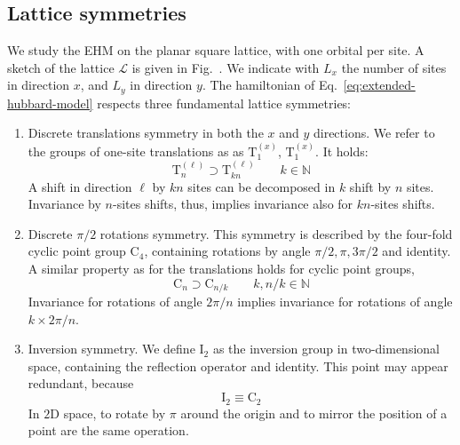 \subsection{Lattice symmetries}\label{subsec:lattice-syms}

We study the EHM on the planar square lattice, with one orbital per site. A sketch of the lattice $\mathcal{L}$ is given in Fig.~\mref. We indicate with $L_x$ the number of sites in direction $x$, and $L_y$ in direction $y$. The hamiltonian of Eq.~\eqref{eq:extended-hubbard-model} respects three fundamental lattice symmetries:
\begin{enumerate}
	\item Discrete translations symmetry in both the $x$ and $y$ directions. We refer to the groups of one-site translations as as $\mathrm{T}_1^{(x)}$, $\mathrm{T}_1^{(x)}$. It holds:
	\begin{equation}\label{eq:ehm-Tn-Tkn}
		\mathrm{T}_n^{(\ell)} \supset \mathrm{T}_{kn}^{(\ell)}
		\qquad
		k\in\mathbb{N}
	\end{equation}
	A shift in direction $\ell$ by $kn$ sites can be decomposed in $k$ shift by $n$ sites. Invariance by $n$-sites shifts, thus, implies invariance also for $kn$-sites shifts.
	\item Discrete $\pi/2$ rotations symmetry. This symmetry is described by the four-fold cyclic point group $\mathrm{C}_4$, containing rotations by angle $\pi/2, \pi, 3\pi/2$ and identity. A similar property as for the translations holds for cyclic point groups,
	\begin{equation}\label{eq:ehm-Cn-Cn/k}
		\mathrm{C}_n \supset \mathrm{C}_{n/k}
		\qquad
		k, n/k \in\mathbb{N}
	\end{equation}
	Invariance for rotations of angle $2\pi/n$ implies invariance for rotations of angle $k \times 2\pi/n$.
	\item Inversion symmetry. We define $\mathrm{I}_2$ as the inversion group in two-dimensional space, containing the reflection operator and identity. This point may appear redundant, because
	\begin{equation}\label{eq:ehm-I2-C2}
		\mathrm{I}_2 \equiv \mathrm{C}_2
	\end{equation}
	In $2$D space, to rotate by $\pi$ around the origin and to mirror the position of a point are the same operation.
\end{enumerate}

